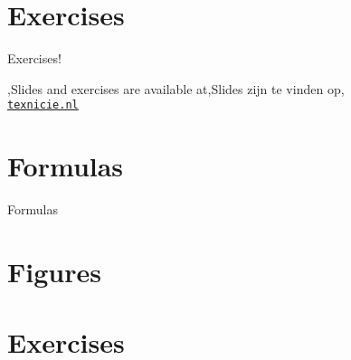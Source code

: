 \documentclass[
    english,
    everyoneauthor=true,
    defaultSlideCollection=vincent,
]{../../cursuspresentatie}
\begin{document}


\section{Exercises}
\def\placetarget{\hypertarget{exercises1}{}}

\begin{frame}
    \begin{center}
        {\LARGE Exercises!}
        \vspace{30pt}

        


        {\Large\lang,Slides and exercises are available at,Slides zijn te vinden op,\\
         \href{https://texnicie.nl}{\ul{\texttt{texnicie.nl}}}}
    \end{center}
\end{frame}

\section{Formulas}
\def\placetarget{\hypertarget{formulas}{}}

\begin{frame}
    Formulas
\end{frame}


\section{Figures}
\def\placetarget{\hypertarget{figures}{}}




\section{Exercises}
\def\placetarget{\hypertarget{exercises2}{}}
\end{document}
